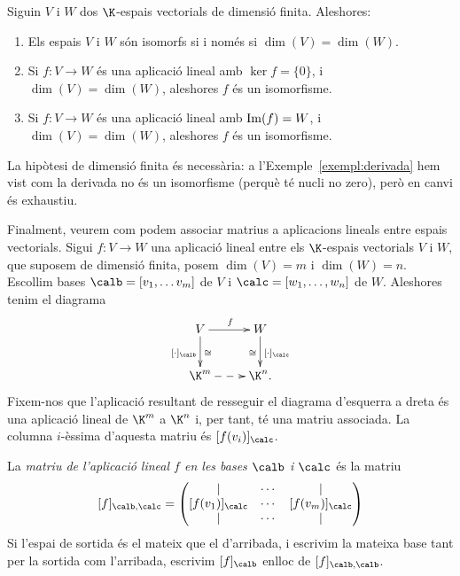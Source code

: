 \begin{proposicio}
    Siguin $V$ i $W$ dos $\K$-espais vectorials de dimensió finita. Aleshores:
    \begin{enumerate}[\rm (a)]
        \item Els espais $V$ i $W$ són isomorfs si i només si $\dim(V)=\dim(W)$.
        \item Si $f\colon V\to W$ és una aplicació lineal amb $\ker f=\{0\}$, i $\dim(V)=\dim(W)$, aleshores $f$ és un isomorfisme.
        \item Si $f\colon V\to W$ és una aplicació lineal amb $\operatorname{Im}(f)=W$, i $\dim(V)=\dim(W)$, aleshores $f$ és un isomorfisme.
    \end{enumerate}
\end{proposicio}

\begin{observacio}
    La hipòtesi de dimensió finita és necessària: a l'Exemple~\ref{exempl:derivada} hem vist com la derivada no és un isomorfisme (perquè té nucli no zero), però en canvi és exhaustiu.
\end{observacio}

Finalment, veurem com podem associar matrius a aplicacions lineals entre espais vectorials. Sigui $f\colon V\to W$ una aplicació lineal entre els $\K$-espais vectorials $V$ i $W$, que suposem de dimensió finita, posem $\dim(V)=m$ i $\dim(W)=n$. Escollim bases $\calb=[v_1,\ldots v_m]$ de $V$ i $\calc=[w_1,\ldots,w_n]$ de $W$. Aleshores tenim el diagrama
\begin{equation}
\label{eq:diagrama-matriu-bases}
\xymatrix{
V\ar[r]^f\ar[d]^{\cong}_{[\cdot]_{\calb}} & W\ar[d]_{\cong}^{[\cdot]_{\calc}}\\
\K^m\ar@{-->}[r]&\K^n.
}
\end{equation}
Fixem-nos que l'aplicació resultant de resseguir el diagrama d'esquerra a dreta és una aplicació lineal de $\K^m$ a $\K^n$ i, per tant, té una matriu associada. La columna $i$-èssima d'aquesta matriu és $[f(v_i)]_\calc$.

\begin{definicio}
La \emph{matriu de l'aplicació lineal $f$ en les bases $\calb$ i $\calc$} és la matriu
\[
[f]_{\calb,\calc}=\begin{pmatrix}
\mid&\cdots&\mid\\
[f(v_1)]_\calc&\cdots&[f(v_m)]_\calc\\
\mid & \cdots &\mid
\end{pmatrix}
\]
Si l'espai de sortida és el mateix que el d'arribada, i escrivim la mateixa base tant per la sortida com l'arribada, escrivim $[f]_\calb$ enlloc de $[f]_{\calb,\calb}$.
\end{definicio}

